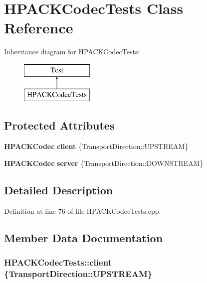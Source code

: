 \section{H\+P\+A\+C\+K\+Codec\+Tests Class Reference}
\label{classHPACKCodecTests}
Inheritance diagram for H\+P\+A\+C\+K\+Codec\+Tests\+:\begin{figure}[H]
\begin{center}
\leavevmode
\includegraphics[height=2.000000cm]{classHPACKCodecTests}
\end{center}
\end{figure}
\subsection*{Protected Attributes}
\begin{DoxyCompactItemize}
\item 
{\bf H\+P\+A\+C\+K\+Codec} {\bf client} \{Transport\+Direction\+::\+U\+P\+S\+T\+R\+E\+AM\}
\item 
{\bf H\+P\+A\+C\+K\+Codec} {\bf server} \{Transport\+Direction\+::\+D\+O\+W\+N\+S\+T\+R\+E\+AM\}
\end{DoxyCompactItemize}


\subsection{Detailed Description}


Definition at line 76 of file H\+P\+A\+C\+K\+Codec\+Tests.\+cpp.



\subsection{Member Data Documentation}
\subsubsection[{client}]{ H\+P\+A\+C\+K\+Codec\+Tests\+::client \{Transport\+Direction\+::\+U\+P\+S\+T\+R\+E\+AM\}\hspace{0.3cm}{\ttfamily [protected]}}\label{classHPACKCodecTests_ae4ef4d33996cc45dd4cbef540a40c167}


